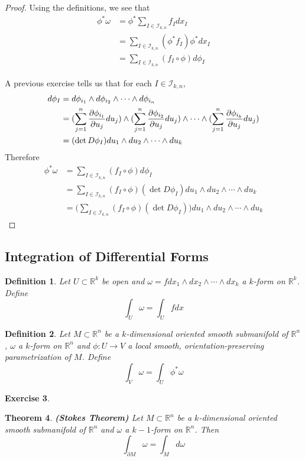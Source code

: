 \documentclass[12pt]{amsart}
\newtheorem{thm}{Theorem}[subsection]
\newtheorem{defn}[thm]{Definition}
\newtheorem{ex}[thm]{Exercise}
\newcommand{\om}{\omega}
\newcommand{\R}{\mathbb{R}}
\newcommand{\MI}{\mathcal{I}}
\begin{document}
	\begin{proof}
		Using the definitions, we see that 
		\begin{align*}
			\phi^* \om 
			&= \phi^*  \sum_{I \in \MI_{k,n}} f_Idx_I \\
			&= \sum_{I \in \MI_{k,n}} (\phi^*f_I) \phi^*dx_I \\
			&= \sum_{I \in \MI_{k,n}} (f_I \circ  \phi)  d\phi_I
		\end{align*}
	
	A previous exercise tells us that for each $I \in \MI_{k,n}$,
	\begin{align*}
		d \phi_I 
		&= d\phi_{i_1} \wedge d\phi_{i_2} \wedge \cdots \wedge d \phi_{i_n} \\
		&= (\sum_{j = 1}^n \pdv{\phi_{i_1}}{u_j} du_j) \wedge (\sum_{j = 1}^n \pdv{\phi_{i_2}}{u_j} du_j) \wedge \cdots \wedge (\sum_{j = 1}^n \pdv{\phi_{i_k}}{u_j} du_j)   \\
		&= (\det D\phi_I)du_1 \wedge du_2 \wedge \cdots \wedge du_k
	\end{align*}
	Therefore 
	\begin{align*}
		\phi^* \om
		&= \sum_{I \in \MI_{k,n}} (f_I \circ  \phi)  d\phi_I \\
		&= \sum_{I \in \MI_{k,n}} (f_I \circ  \phi)  (\det D\phi_I)du_1 \wedge du_2 \wedge \cdots \wedge du_k \\
		&= \bigg(\sum_{I \in \MI_{k,n}} (f_I \circ  \phi)  (\det D\phi_I)\bigg)du_1 \wedge du_2 \wedge \cdots \wedge du_k
	\end{align*}
	\end{proof}
	
	\subsection{Integration of Differential Forms}
	
	\begin{defn}
		Let $U \subset \R^k$ be open and $\om = f dx_1 \wedge dx_2 \wedge \cdots \wedge dx_k$ a $k$-form on $\R^k$. Define $$\int_U \om = \int_U f dx$$
	\end{defn}
	
	\begin{defn}
		Let $M \subset \R^n$ be a $k$-dimensional oriented smooth submanifold of $\R^n$, $\om$ a $k$-form on $\R^n$ and $\phi: U \rightarrow V$ a local smooth, orientation-preserving parametrization of $M$. Define $$\int_V \om = \int_U \phi^*\om $$
	\end{defn} 

	\begin{ex}
		
	\end{ex}

	\begin{thm}{\textbf{(Stokes Theorem)}}
		Let $M \subset \R^n$ be a $k$-dimensional oriented smooth submanifold of $\R^n$ and $\om$ a $k-1$-form on $\R^n$. Then $$\int_{\partial M} \om = \int_M d \om$$
	\end{thm}
\end{document}
